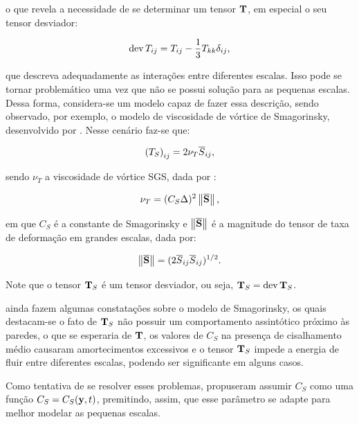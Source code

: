 \documentclass[_ArquivoPrincipal.tex]{subfiles}
\begin{document}
\noindent o que revela a necessidade de se determinar um tensor $\mathbf{T}$, em especial o seu tensor desviador:

\begin{equation}
    \mathop{\mathrm{dev}}\nolimits{T_{ij}}=T_{ij}-\frac{1}{3}T_{kk}\delta_{ij}\text{,}
\end{equation}

\noindent que descreva adequadamente as interações entre diferentes escalas. Isso pode se tornar problemático uma vez que não se possui solução para as pequenas escalas. Dessa forma, considera-se um modelo capaz de fazer essa descrição, sendo observado, por exemplo, o modelo de viscosidade de vórtice de Smagorinsky, desenvolvido por . Nesse cenário faz-se que:

\begin{equation}
    \left({T_S}\right)_{ij}=2\nu_T\overline{S}_{ij}\text{,}
\end{equation}

\noindent sendo $\nu_T$ a viscosidade de vórtice SGS, dada por \cite{germano1991dynamic,piomelli1999large,hughes2000large}:

\begin{equation}
    \nu_T=(C_S\Delta)^2\left\lVert{\overline{\mathbf{S}}}\right\lVert\text{,}
\end{equation}

\noindent em que $C_S$ é a constante de Smagorinsky e $\left\lVert{\overline{\mathbf{S}}}\right\lVert$ é a magnitude do tensor de taxa de deformação em grandes escalas, dada por:

\begin{equation}
    \left\lVert{\overline{\mathbf{S}}}\right\lVert=(2\overline{S}_{ij}\overline{S}_{ij})^{1/2}\text{.}
\end{equation}

Note que o tensor $\mathbf{T}_S$ é um tensor desviador, ou seja, $\mathbf{T}_S=\mathop{\mathrm{dev}}\nolimits{\mathbf{T}_S}$.

 ainda fazem algumas constatações sobre o modelo de Smagorinsky, os quais destacam-se o fato de $\mathbf{T}_S$ não possuir um comportamento assintótico próximo às paredes, o que se esperaria de $\mathbf{T}$, os valores de $C_S$ na presença de cisalhamento médio causaram amortecimentos excessivos e o tensor $\mathbf{T}_S$ impede a energia de fluir entre diferentes escalas, podendo ser significante em alguns casos.

Como tentativa de se resolver esses problemas,  propuseram assumir $C_S$ como uma função $C_S=C_S(\mathbf{y},t)$, premitindo, assim, que esse parâmetro se adapte para melhor modelar as pequenas escalas.
\end{document}

